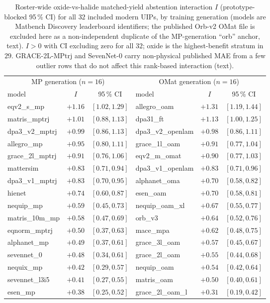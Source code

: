 \documentclass[11pt]{article}
\begin{document}
\begin{table}[t]
  \centering
  \small
  \caption{Roster-wide oxide-vs-halide matched-yield abstention interaction $I$ (prototype-blocked
  95\,\% CI) for all $32$ included modern UIPs, by training generation (models are Matbench
  Discovery leaderboard identifiers; the published Orb-v2
  OMat file is excluded here as a non-independent duplicate of the MP-generation ``orb'' anchor,
  text). $I>0$ with CI excluding zero for all $32$; oxide is the highest-benefit stratum in $29$.
  GRACE-2L-MPtrj and SevenNet-0 carry non-physical published MAE from a few outlier rows that do
  not affect this rank-based interaction (text).}
  \label{tab:roster}
  \begin{tabular}{lcc@{\hskip 1.4em}lcc}
    \toprule
    \multicolumn{3}{c}{MP generation ($n=16$)} & \multicolumn{3}{c}{OMat generation ($n=16$)} \\
    \cmidrule(lr){1-3}\cmidrule(lr){4-6}
    model & $I$ & 95\,\% CI & model & $I$ & 95\,\% CI \\
    \midrule
    eqv2\_s\_mp & $+1.16$ & $[1.02,1.29]$ & allegro\_oam & $+1.31$ & $[1.19,1.44]$ \\
    matris\_mptrj & $+1.01$ & $[0.88,1.13]$ & dpa31\_ft & $+1.13$ & $[1.00,1.25]$ \\
    dpa3\_v2\_mptrj & $+0.99$ & $[0.86,1.13]$ & dpa3\_v2\_openlam & $+0.98$ & $[0.86,1.11]$ \\
    allegro\_mp & $+0.95$ & $[0.80,1.11]$ & grace\_1l\_oam & $+0.91$ & $[0.77,1.04]$ \\
    grace\_2l\_mptrj & $+0.91$ & $[0.76,1.06]$ & eqv2\_m\_omat & $+0.90$ & $[0.77,1.03]$ \\
    mattersim & $+0.83$ & $[0.71,0.94]$ & dpa3\_v1\_openlam & $+0.83$ & $[0.71,0.96]$ \\
    dpa3\_v1\_mptrj & $+0.83$ & $[0.70,0.95]$ & alphanet\_oma & $+0.70$ & $[0.58,0.82]$ \\
    hienet & $+0.74$ & $[0.60,0.87]$ & esen\_oam & $+0.70$ & $[0.58,0.81]$ \\
    nequip\_mp & $+0.59$ & $[0.45,0.73]$ & nequip\_oam\_xl & $+0.67$ & $[0.55,0.77]$ \\
    matris\_10m\_mp & $+0.58$ & $[0.47,0.69]$ & orb\_v3 & $+0.64$ & $[0.52,0.76]$ \\
    eqnorm\_mptrj & $+0.50$ & $[0.37,0.63]$ & mace\_mpa & $+0.62$ & $[0.48,0.75]$ \\
    alphanet\_mp & $+0.49$ & $[0.37,0.61]$ & grace\_3l\_oam & $+0.57$ & $[0.45,0.67]$ \\
    sevennet\_0 & $+0.48$ & $[0.34,0.61]$ & grace\_2l\_oam & $+0.55$ & $[0.44,0.68]$ \\
    nequix\_mp & $+0.42$ & $[0.29,0.57]$ & nequip\_oam & $+0.54$ & $[0.42,0.64]$ \\
    sevennet\_l3i5 & $+0.41$ & $[0.27,0.55]$ & matris\_oam & $+0.50$ & $[0.40,0.61]$ \\
    esen\_mp & $+0.38$ & $[0.25,0.52]$ & grace\_2l\_oam\_l & $+0.31$ & $[0.19,0.42]$ \\
    \bottomrule
  \end{tabular}
\end{table}
\end{document}
